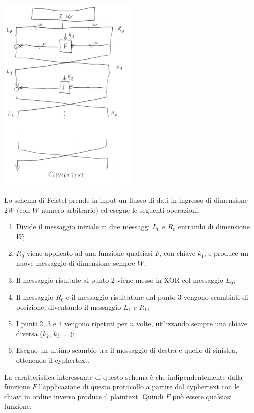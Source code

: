 \begin{center}
    \includegraphics[width=0.5\textwidth]{images/3.png}
\end{center}

Lo schema di Feistel prende in input un flusso di dati in ingresso di dimensione $2W$ (con $W$ numero arbitrario) ed esegue le seguenti operazioni:
\begin{enumerate}
    \item Divide il messaggio iniziale in due messaggi $L_0$ e $R_0$ entrambi di dimensione $W$;
    \item $R_0$ viene applicato ad una funzione qualsiasi $F$, con chiave $k_1$, e produce un nuove messaggio di dimensione sempre $W$;
    \item Il messaggio risultate al punto 2 viene messo in XOR col messaggio $L_0$;
    \item Il messaggio $R_0$ e il messaggio risultatane dal punto 3 vengono scambiati di posizione, diventando il messaggio $L_1$ e $R_1$;
    \item I punti 2, 3 e 4 vengono ripetuti per $n$ volte, utilizzando sempre una chiave diversa ($k_2$, $k_3$, ...);
    \item Eseguo un ultimo scambio tra il messaggio di destra e quello di sinistra, ottenendo il cyphertext.
\end{enumerate}

\noindent La caratteristica interessante di questo schema è che indipendentemente dalla funzione $F$ l'applicazione di questo protocollo a partire dal cyphertext con le chiavi in ordine inverso produce il plaintext. Quindi $F$ può essere qualsiasi funzione. 
\\

